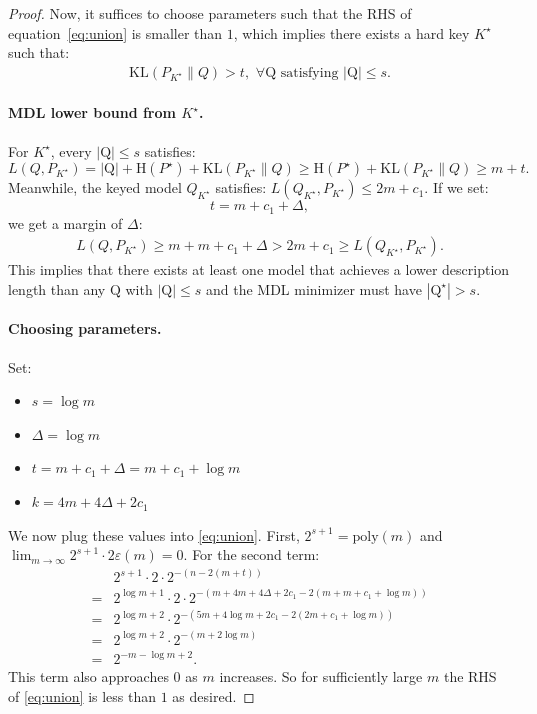 \documentclass[twoside]{article}
\newcommand{\rH}{\mathrm{H}}
\begin{document}
\begin{proof}
Now, it suffices to choose parameters such that the RHS of equation~\ref{eq:union} is smaller than $1$, which implies there exists a hard key $K^\star$ such that:
\begin{align}
    \mathrm{KL}(P_{K^\star}\|Q) > t, \,\,\forall \mathrm{Q} \,\,\text{satisfying} \,\,|\mathrm{Q}| \leq s.
\end{align}

\paragraph{MDL lower bound from $K^\star$.} 
For $K^\star$, every $|\mathrm{Q}|\leq s$ satisfies:
$$L(Q, P_{K^\star}) = |\mathrm{Q}| + \rH(P^\star) + \mathrm{KL}(P_{K^\star}\|Q) \geq \rH(P^\star) + \mathrm{KL}(P_{K^\star}\|Q) \geq m + t.$$
Meanwhile, the keyed model $Q_{K^\star}$ satisfies: $L(Q_{K^\star}, P_{K^\star}) \leq 2m + c_1.$
If we set:
$$t = m + c_1 + \Delta,$$
we get a margin of $\Delta$:
\begin{align}
 L(Q, P_{K^\star}) \geq m + m + c_1 + \Delta > 2m + c_1 \geq   L(Q_{K^\star}, P_{K^\star}).  
\end{align}
This implies that there exists at least one model that achieves a lower description length than any $\mathrm{Q}$ with $|\mathrm{Q}|\leq s$ and the MDL minimizer must have $|\mathrm{Q}^\star| > s$.

\paragraph{Choosing parameters.} 
Set:
\begin{itemize}
    \item $s = \log m$
    \item $\Delta = \log m$
    \item $t = m + c_1 + \Delta = m + c_1 + \log m$
    \item $k = 4m + 4\Delta + 2c_1$
\end{itemize}
We now plug these values into \autoref{eq:union}. First, $2^{s+1} = \mathrm{poly}(m)$ and $\lim_{m \rightarrow \infty} 2^{s+1}\cdot 2 \varepsilon(m) = 0$. For the second term:
\begin{align*}
    &2^{s+1} \cdot 2 \cdot 2^{-(n-2(m+t))} \\
    =& 2^{\log m+1} \cdot 2 \cdot 2^{-(m+4m+4\Delta + 2c_1-2(m+m + c_1 + \log m))} \\
    =& 2^{\log m+2}  \cdot 2^{-(5m+4\log m + 2c_1-2(2m + c_1 + \log m))}\\
    =& 2^{\log m+2}  \cdot 2^{-(m+2\log m)} \\
    =& 2^{-m-\log m+2}.
\end{align*}
This term also approaches $0$ as $m$ increases. So for sufficiently large $m$ the RHS of \autoref{eq:union} is less than $1$ as desired.

\end{proof}
\end{document}
